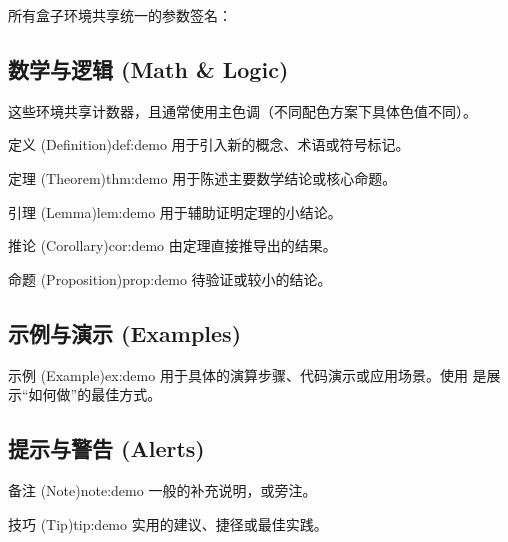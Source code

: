 \documentclass[
    outputdir=build,
    colorscheme=Tech,
    shorthand=true,
    code=true,
    fontset=lit
]{Hypo-Note}
\begin{document}
所有盒子环境共享统一的参数签名：

\subsection{数学与逻辑 (Math \& Logic)}

这些环境共享计数器，且通常使用主色调（不同配色方案下具体色值不同）。

\begin{definition}{定义 (Definition)}{def:demo}
    用于引入新的概念、术语或符号标记。
\end{definition}

\begin{theorem}{定理 (Theorem)}{thm:demo}
    用于陈述主要数学结论或核心命题。
\end{theorem}

\begin{lemma}{引理 (Lemma)}{lem:demo}
    用于辅助证明定理的小结论。
\end{lemma}

\begin{corollary}{推论 (Corollary)}{cor:demo}
    由定理直接推导出的结果。
\end{corollary}

\begin{proposition}{命题 (Proposition)}{prop:demo}
    待验证或较小的结论。
\end{proposition}

\subsection{示例与演示 (Examples)}

\begin{example}{示例 (Example)}{ex:demo}
    用于具体的演算步骤、代码演示或应用场景。使用  是展示“如何做”的最佳方式。
\end{example}

\subsection{提示与警告 (Alerts)}

\begin{note}{备注 (Note)}{note:demo}
    一般的补充说明，或旁注。
\end{note}

\begin{tip}{技巧 (Tip)}{tip:demo}
    实用的建议、捷径或最佳实践。
\end{tip}
\end{document}
